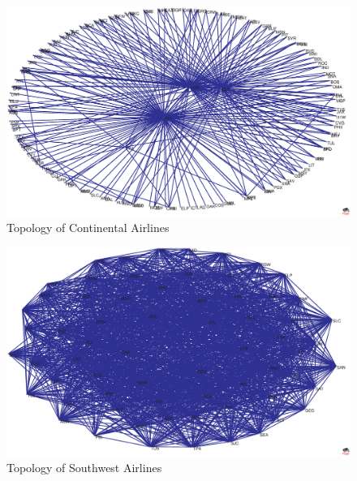 \documentclass[10pt]{article}
\begin{document}
\begin{figure}[htp]
	\begin{center}
		\includegraphics[width=4.5in]{continental-network}%
		\caption{\label{fig:continental}Topology of Continental Airlines}
	\end{center}
\end{figure}

\begin{figure}[htp]
	\begin{center}
		\includegraphics[width=4.5in]{southwest-network}%
		\caption{\label{fig:southwest}Topology of Southwest Airlines}
	\end{center}
\end{figure}





\end{document}
